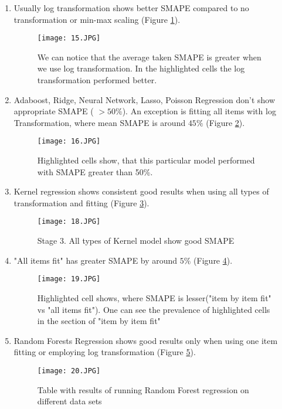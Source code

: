 \documentclass{article}
\begin{document}
\begin{enumerate}
\item  Usually log transformation shows better SMAPE compared to no transformation or min-max scaling (Figure \ref{fig:usually_log_transform}).

\begin{figure}[H]
\texttt{[image: 15.JPG]}
\centering
\caption{We can notice that the average taken SMAPE is greater when we use log transformation. In the highlighted cells the log transformation performed better.}
\label{fig:usually_log_transform}
\end{figure}


\item  Adaboost, Ridge, Neural Network, Lasso, Poisson Regression don’t show appropriate SMAPE ( $>50\%$). An exception is fitting all items with log 
Transformation, where mean SMAPE is around $45\%$ (Figure \ref{fig:adaboost_ridge_neural}).

\begin{figure}[H]
\texttt{[image: 16.JPG]}
\centering\textbf{\textbf{}}
\caption{Highlighted cells show, that this particular model performed with SMAPE greater than 50\%. }
\label{fig:adaboost_ridge_neural}
\end{figure}

\item  Kernel regression shows consistent good results when using all types of transformation and fitting (Figure \ref{fig:kernel_regression}). 
\begin{figure}[H]
\texttt{[image: 18.JPG]}
\centering
\caption{Stage 3. All types of Kernel model show good SMAPE }
\label{fig:kernel_regression}
\end{figure}

\item "All items fit" has greater SMAPE by around $5\%$ (Figure \ref{fig:all_items_fit}). 
\begin{figure}[H]
\texttt{[image: 19.JPG]}
\centering
\caption{Highlighted cell shows, where SMAPE is lesser("item by item fit" vs "all items fit"). One can see the prevalence of highlighted cells in the section of "item by item fit"}
\label{fig:all_items_fit}
\end{figure}

\item  Random Forests Regression shows good results only when using one item fitting or employing log transformation (Figure \ref{fig:random_forests_regrression_shows}).  
\begin{figure}[H]
\texttt{[image: 20.JPG]}
\caption{Table with results of running Random Forest regression on different data sets}
\label{fig:random_forests_regrression_shows}
\centering
\end{figure}



\end{enumerate}
\end{document}
